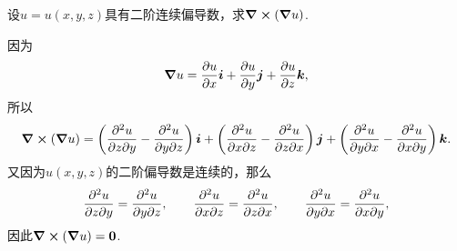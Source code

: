 \begin{example}
设\(u = u(x,y,z)\)具有二阶连续偏导数，求\(\curl(\grad u)\).
\begin{solution}
因为\[
\grad u = \pdv{u}{x} \boldsymbol{i} + \pdv{u}{y} \boldsymbol{j} + \pdv{u}{z} \boldsymbol{k},
\]所以\[
\curl(\grad u)
= \left( \pdv[2]{u}{z}{y} - \pdv[2]{u}{y}{z} \right) \boldsymbol{i}
+ \left( \pdv[2]{u}{x}{z} - \pdv[2]{u}{z}{x} \right) \boldsymbol{j}
+ \left( \pdv[2]{u}{y}{x} - \pdv[2]{u}{x}{y} \right) \boldsymbol{k}.
\]又因为\(u(x,y,z)\)的二阶偏导数是连续的，那么\[
\pdv[2]{u}{z}{y} = \pdv[2]{u}{y}{z},
\qquad
\pdv[2]{u}{x}{z} = \pdv[2]{u}{z}{x},
\qquad
\pdv[2]{u}{y}{x} = \pdv[2]{u}{x}{y},
\]因此\(\curl(\grad u) = \boldsymbol{0}\).
\end{solution}
\end{example}
